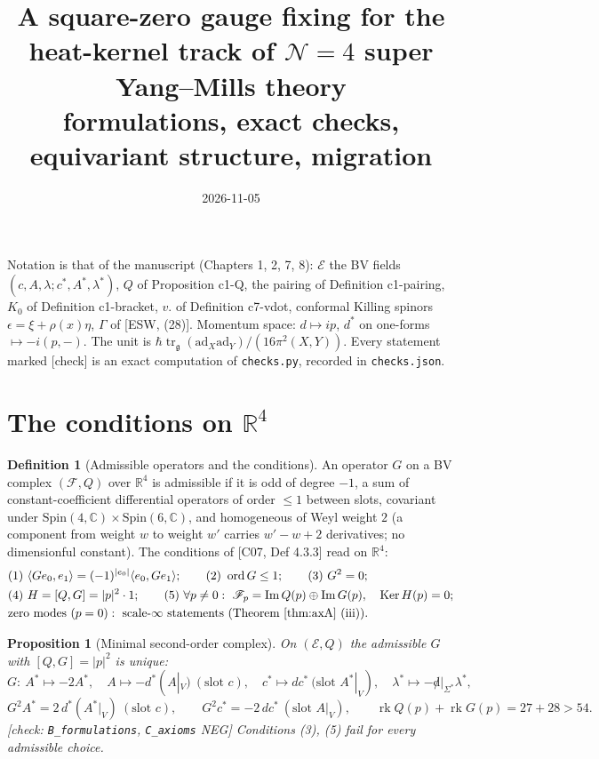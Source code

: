 \documentclass[11pt]{article}
\title{A square-zero gauge fixing for the heat-kernel track of $\mathcal N=4$ super Yang--Mills theory\\[2pt]\large formulations, exact checks, equivariant structure, migration}
\author{}\date{2026-11-05}
\theoremstyle{plain}
\newtheorem{proposition}[theorem]{Proposition}
\theoremstyle{definition}
\newtheorem{definition}[theorem]{Definition}
\numberwithin{equation}{section}
\begin{document}
\maketitle

Notation is that of the manuscript (Chapters 1, 2, 7, 8): $\mathscr E$ the BV fields $(c,A,\lambda;c^*,A^*,\lambda^*)$, $Q$ of Proposition c1-Q, the pairing of Definition c1-pairing, $K_0$ of Definition c1-bracket, $v.$ of Definition c7-vdot, conformal Killing spinors $\epsilon=\xi+\rho(x)\eta$, $\Gamma$ of [ESW, (28)]. Momentum space: $d\mapsto ip$, $d^*$ on one-forms $\mapsto-i(p,-)$. The unit is $\hbar\operatorname{tr}_{\mathfrak g}(\mathrm{ad}_X\mathrm{ad}_Y)/(16\pi^2(X,Y))$. Every statement marked [check] is an exact computation of \texttt{checks.py}, recorded in \texttt{checks.json}.

\section{\texorpdfstring{The conditions on $\mathbb R^4$}{The conditions on R4}}

\begin{definition}[Admissible operators and the conditions]
\label{def:adm}
An operator $G$ on a BV complex $(\mathscr F,Q)$ over $\mathbb R^4$ is admissible if it is odd of degree $-1$, a sum of constant-coefficient differential operators of order $\le1$ between slots, covariant under $\mathrm{Spin}(4,\mathbb C)\times\mathrm{Spin}(6,\mathbb C)$, and homogeneous of Weyl weight $2$ (a component from weight $w$ to weight $w'$ carries $w'-w+2$ derivatives; no dimensionful constant). The conditions of [C07, Def 4.3.3] read on $\mathbb R^4$:
\[
\begin{aligned}
&(1)\ \langle Ge_0,e_1\rangle=(-1)^{|e_0|}\langle e_0,Ge_1\rangle;\qquad (2)\ \operatorname{ord}G\le1;\qquad (3)\ G^2=0;\\
&(4)\ H=[Q,G]=|p|^2\cdot1;\qquad (5)\ \forall p\neq0:\ \mathscr F_p=\operatorname{Im}Q(p)\oplus\operatorname{Im}G(p),\quad \operatorname{Ker}H(p)=0;\\
&\text{zero modes }(p=0):\ \text{scale-}\infty\text{ statements (Theorem \ref{thm:axA} (iii)).}
\end{aligned}
\]
\end{definition}

\begin{proposition}[Minimal second-order complex]
\label{prop:min}
On $(\mathscr E,Q)$ the admissible $G$ with $[Q,G]=|p|^2$ is unique:
\[
G:\ A^*\mapsto-2A^*,\quad A\mapsto-d^*(A|_V)\ (\text{slot }c),\quad c^*\mapsto dc^*\ (\text{slot }A^*|_V),\quad \lambda^*\mapsto-{\not d}|_{\Sigma^*}\lambda^*,
\]
\[
G^2A^*=2\,d^*(A^*|_V)\ (\text{slot }c),\qquad G^2c^*=-2\,dc^*\ (\text{slot }A|_V),\qquad \operatorname{rk}Q(p)+\operatorname{rk}G(p)=27+28>54 .
\]
[check: \texttt{B\_formulations}, \texttt{C\_axioms} NEG] Conditions (3), (5) fail for every admissible choice.
\end{proposition}
\end{document}
